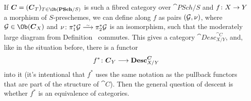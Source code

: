 \documentclass[a4paper,parskip=half,numbers=enddot, DIV=12]{scrreprt}
\begin{document}
If $\cat C=(\cat C_T)_{T\in\Ob(\cat{PSch}/S)}$ is such a fibred category over $\cat{PSch}/S$ and $f\colon X\morphism Y$ a morphism of $S$-preschemes, we can define  along $f$ as pairs $(\mathcal{G},\nu)$, where $\Gg\in\Ob(\cat C_X)$ and $\nu\colon \pi_1^*\Gg\isomorphism\pi_2^*\Gg$ is an isomorphism, such that the moderately large diagram from Definition~ commutes. This gives a category $\cat{Desc}_{X/Y}^{\cat{C}}$, and, like in the situation before, there is a functor
\begin{align*}
	f^*\colon \cat C_Y\morphism\cat{Desc}_{X/Y}^{\cat{C}}
\end{align*}
into it (it's intentional that $f^*$ uses the same notation as the pullback functors that are part of the structure of $\cat C$). Then the general question of descent is whether $f^*$ is an equivalence of categories.
\end{document}
